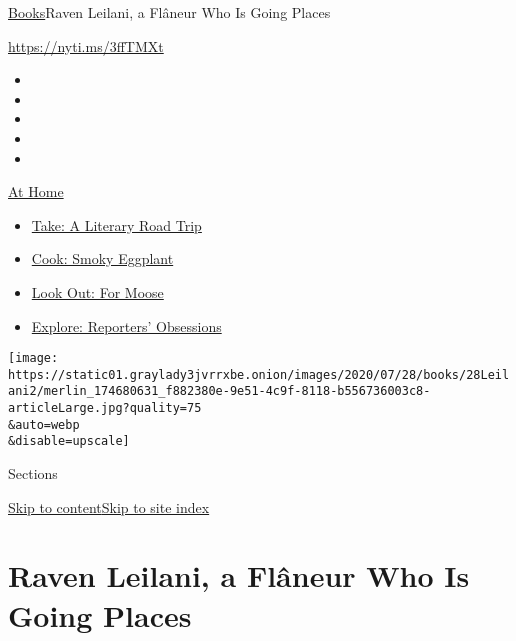 \href{/section/books}{Books}\textbar{}Raven Leilani, a Flâneur Who Is
Going Places

\url{https://nyti.ms/3ffTMXt}

\begin{itemize}
\item
\item
\item
\item
\item
\end{itemize}

\href{https://www.nytimes3xbfgragh.onion/spotlight/at-home?action=click\&pgtype=Article\&state=default\&region=TOP_BANNER\&context=at_home_menu}{At
Home}

\begin{itemize}
\tightlist
\item
  \href{https://www.nytimes3xbfgragh.onion/2020/07/28/books/time-for-a-literary-road-trip.html?action=click\&pgtype=Article\&state=default\&region=TOP_BANNER\&context=at_home_menu}{Take:
  A Literary Road Trip}
\item
  \href{https://www.nytimes3xbfgragh.onion/2020/07/29/magazine/bored-with-your-home-cooking-some-smoky-eggplant-will-fix-that.html?action=click\&pgtype=Article\&state=default\&region=TOP_BANNER\&context=at_home_menu}{Cook:
  Smoky Eggplant}
\item
  \href{https://www.nytimes3xbfgragh.onion/2020/07/27/travel/moose-michigan-isle-royale.html?action=click\&pgtype=Article\&state=default\&region=TOP_BANNER\&context=at_home_menu}{Look
  Out: For Moose}
\item
  \href{https://www.nytimes3xbfgragh.onion/interactive/2020/at-home/even-more-reporters-editors-diaries-lists-recommendations.html?action=click\&pgtype=Article\&state=default\&region=TOP_BANNER\&context=at_home_menu}{Explore:
  Reporters' Obsessions}
\end{itemize}

\texttt{[image: https://static01.graylady3jvrrxbe.onion/images/2020/07/28/books/28Leilani2/merlin\_174680631\_f882380e-9e51-4c9f-8118-b556736003c8-articleLarge.jpg?quality=75\\\&auto=webp\\\&disable=upscale]}

Sections

\protect\hyperlink{site-content}{Skip to
content}\protect\hyperlink{site-index}{Skip to site index}

\hypertarget{raven-leilani-a-fluxe2neur-who-is-going-places}{%
\section{Raven Leilani, a Flâneur Who Is Going
Places}\label{raven-leilani-a-fluxe2neur-who-is-going-places}}

